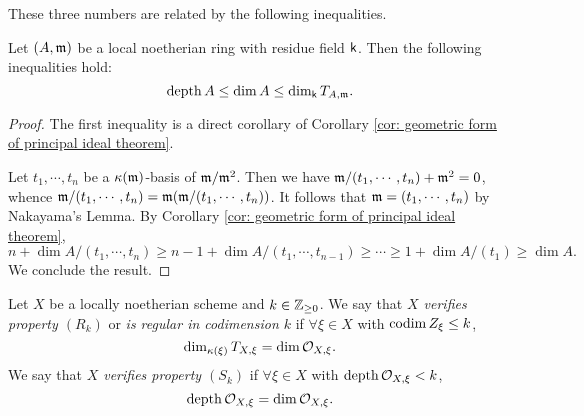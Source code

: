     These three numbers are related by the following inequalities.
    \begin{proposition}\label{prop: inequality of depth, dimension and dimension of tangent space}
        Let $(A,{\mathfrak{m}})$ be a local noetherian ring with residue field ${\mathsf{k}}$.
        Then the following inequalities hold:
        \[ \operatorname{depth} A \leq \dim A \leq \dim_{\mathsf{k}} T_{A,{\mathfrak{m}}}. \]
    \end{proposition}
    \begin{proof}
        The first inequality is a direct corollary of Corollary \ref{cor: geometric form of principal ideal theorem}.

        Let $t_1,\cdots,t_n$ be a ${\kappa}({\mathfrak{m}})$-basis of ${\mathfrak{m}}/{\mathfrak{m}}^2$.
        Then we have ${\mathfrak{m}}/(t_1,\cdots,t_n)+{\mathfrak{m}}^2 = 0$, whence ${\mathfrak{m}}/(t_1,\cdots,t_n) = {\mathfrak{m}}({\mathfrak{m}}/(t_1,\cdots,t_n))$.
        It follows that ${\mathfrak{m}} = (t_1,\cdots,t_n)$ by Nakayama's Lemma.
        By Corollary \ref{cor: geometric form of principal ideal theorem}, 
        \[ n + \dim A/(t_1,\cdots,t_n) \geq n-1 + \dim A/(t_1,\cdots,t_{n-1}) \geq \cdots \geq 1 + \dim A/(t_1) \geq \dim A. \]  
        We conclude the result.
    \end{proof}


    \begin{definition}\label{def: regular and Serre's conditions}
        Let $X$ be a locally noetherian scheme and $k \in {\mathbb{Z}}_{\geq 0}$.
        We say that \textit{$X$ verifies property $(R_k)$} or \textit{is regular in codimension $k$} if $\forall \xi \in X$ with $\operatorname{codim} Z_\xi \leq k$, 
        \[ \dim_{{\kappa}(\xi)} T_{X,\xi} = \dim {\mathcal{O}}_{X,\xi}. \]
        We say that \textit{$X$ verifies property $(S_k)$} if $\forall \xi \in X$ with $\operatorname{depth} {\mathcal{O}}_{X,\xi} < k$,
        \[ \operatorname{depth} {\mathcal{O}}_{X,\xi} = \dim {\mathcal{O}}_{X,\xi}. \]        
    \end{definition}


